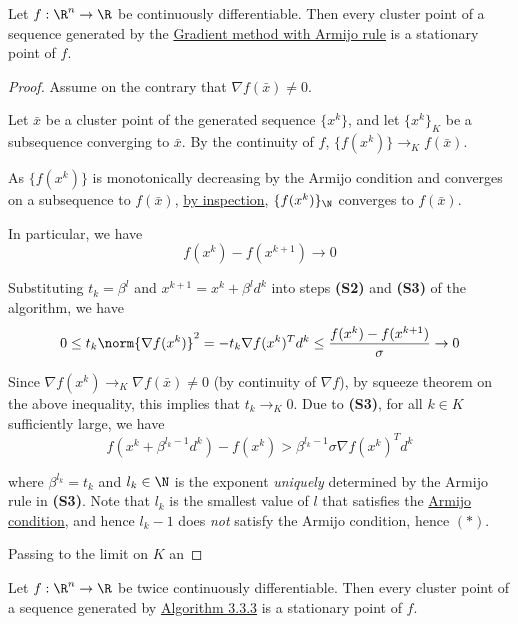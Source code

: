 \label{bbb25cd}

Let $f:\R^n\to\R$ be continuously differentiable. Then every cluster
point of a sequence generated by the \hyperref[ae01f6d]{Gradient
	method with Armijo rule} is a stationary point of $f$.

\begin{proof}
	\def\xk{\{x^k\}}
	\def\grad#1{\nabla f(#1)}
	Assume on the contrary that $\grad{\bar x}\neq0$.

	Let $\bar x$ be a cluster point of the generated sequence $\xk$, and
	let $\xk_K$ be a subsequence converging to $\bar x$. By the
	continuity of $f$, $\{f(x^k)\}\to_Kf(\bar x)$.

	As $\{f(x^k)\}$ is monotonically decreasing by the Armijo condition
	and converges on a subsequence to $f(\bar x)$, \hyperref[aaf3ba6]{by
		inspection}, $\{f(x^k)\}_\N$ converges to $f(\bar x)$.

	In particular, we have
	$$f(x^k)-f(x^{k+1})\to0$$

	Substituting $t_k=\beta^l$ and $x^{k+1}=x^k+\beta^ld^k$ into steps
	\textbf{(S2)} and \textbf{(S3)} of the algorithm, we have
	$$
		0\leq
		t_k\norm{\grad{x^k}}^2=
		-t_k\grad{x^k}^Td^k\leq
		\frac{f(x^k)-f(x^{k+1})}\sigma\to0
	$$

	Since $\grad{x^k}\to_K\grad{\bar x}\neq0$ (by continuity of $\nabla
		f$), by squeeze theorem on the above inequality, this implies that
	$t_k\to_K0$. Due to \textbf{(S3)}, for all $k\in K$ sufficiently
	large, we have
	\begin{equation*}
		f(x^k+\beta^{l_k-1}d^k)-f(x^k)>\beta^{l_k-1}\sigma\grad{x^k}^Td^k\tag*{($*$)}
	\end{equation*}

	where $\beta^{l_k}=t_k$ and $l_k\in\N$ is the exponent
	\textit{uniquely} determined by the Armijo rule in \textbf{(S3)}.
	Note that $l_k$ is the smallest value of $l$ that satisfies the
	\hyperref[fefb024]{Armijo condition}, and hence $l_k-1$ does \textit{not}
	satisfy the Armijo condition, hence $(*)$.

	Passing to the limit on $K$ an
\end{proof}

\label{a66db73}

Let $f:\R^n\to\R$ be twice continuously differentiable. Then every
cluster point of a sequence generated by \hyperref[a7a5665]{Algorithm
	3.3.3} is a stationary point of $f$.

